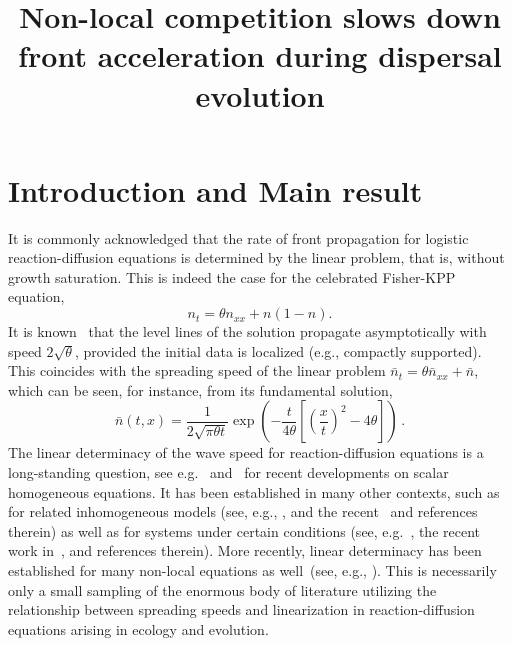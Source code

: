 \documentclass[AHL,Unicode,longabstracts]{cedram}
\title[Non-local competition slows down front acceleration during dispersal evolution]{Non-local competition slows down front acceleration during dispersal evolution}
\author[\initial{V.} \lastname{Calvez}]{\firstname{Vincent} \lastname{Calvez}}
\author[\initial{C.} \lastname{Henderson}]{\firstname{Christopher} \lastname{Henderson}}
\author[\initial{S.} \lastname{Mirrahimi}]{\firstname{Sepideh} \lastname{Mirrahimi}}
\author[\initial{O.} \lastname{Turanova}]{\firstname{Olga} \lastname{Turanova}}
\author[\initial{T.} \lastname{Dumont}]{\firstname{Thierry} \lastname{Dumont}}
\newcommand{\1}{\mathds{1}}
\begin{document}
\maketitle



\section{Introduction and Main result}\label{sec:intro}

It is commonly acknowledged that the rate of front propagation for logistic reaction-diffusion equations is determined by the linear problem, that is, without growth saturation. This is indeed the case for the celebrated Fisher-KPP equation,
\begin{equation}\label{eq:FKPP}
n_t = \theta n_{xx} + n(1-n).
\end{equation}
It is known~\cite{AronsonWeinberger2,Fisher,KPP} that the level lines of the solution propagate asymptotically with speed $2\sqrt{\theta}$, provided the initial data is localized (e.g., compactly supported). This coincides with the spreading speed of the linear problem $\bar n_t = \theta \bar n_{xx} + \bar n$, which can be seen, for instance, from its fundamental solution,
\begin{equation*}
\bar n(t,x) = \dfrac{1}{2\sqrt{\pi \theta t}}\exp\left(-\dfrac{t}{4\theta} \left [\left(\dfrac{x}t\right)^2 - 4\theta \right]\right)\,.
\end{equation*}
The linear determinacy of the wave speed for reaction-diffusion equations is a long-standing question, see e.g.~\cite{crooks_travelling_2003,hadeler_travelling_1975} and~\cite{lucia_linear_2004,weinberger_sufficient_2012} for recent developments on scalar homogeneous equations. It has been established in many other contexts, such as for related inhomogeneous models (see, e.g., \cite{BerestyckiHamel02,berestycki_speed_2005}, and the recent~\cite{nadin_generalized_2017} and references therein) as well as for systems under certain conditions (see, e.g.~\cite{lewis_spreading_2002,li_spreading_2005, weinberger_analysis_2002}, the recent work in~\cite{girardin_non-cooperative_2018,girardin_non-cooperative_2018-1}, and references therein). More recently, linear determinacy has been established for many non-local equations as well~(see, e.g., \cite{AlfaroCovilleRaoul,BerestyckiJinSilvestre,berestycki_non-local_2009, HamelRyzhik}). This is necessarily only a small sampling of the enormous body of literature utilizing the relationship between spreading speeds and linearization in reaction-diffusion equations arising in ecology and evolution.
\end{document}
